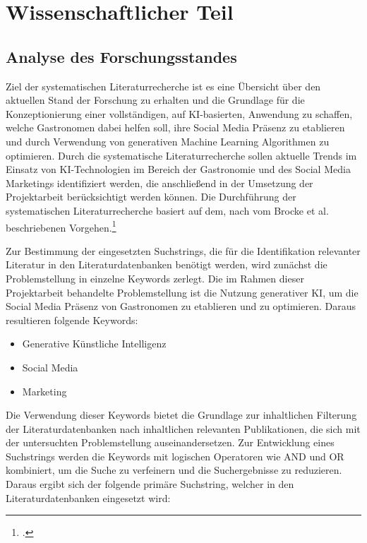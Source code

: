 \newpage
\section{Wissenschaftlicher Teil}

\subsection{Analyse des Forschungsstandes}
Ziel der systematischen Literaturrecherche ist es eine Übersicht über den aktuellen Stand der Forschung zu erhalten und die Grundlage für die Konzeptionierung einer vollständigen, auf \ac{KI}-basierten, Anwendung zu schaffen, welche Gastronomen dabei helfen soll, ihre Social Media Präsenz zu etablieren und durch Verwendung von generativen Machine Learning Algorithmen zu optimieren.
Durch die systematische Literaturrecherche sollen aktuelle Trends im Einsatz von \ac{KI}-Technologien im Bereich der Gastronomie und des Social Media Marketings identifiziert werden, die anschließend in der Umsetzung der Projektarbeit berücksichtigt werden können.
Die Durchführung der systematischen Literaturrecherche basiert auf dem, nach vom Brocke et al. beschriebenen Vorgehen.\footcite{brocke2015standing}

Zur Bestimmung der eingesetzten Suchstrings, die für die Identifikation relevanter Literatur in den Literaturdatenbanken benötigt werden, wird zunächst die Problemstellung in einzelne Keywords zerlegt.
Die im Rahmen dieser Projektarbeit behandelte Problemstellung ist die Nutzung generativer KI, um die Social Media Präsenz von Gastronomen zu etablieren und zu optimieren.
Daraus resultieren folgende Keywords:

\begin{itemize}
    \item Generative Künstliche Intelligenz
    \item Social Media
    \item Marketing
\end{itemize}

Die Verwendung dieser Keywords bietet die Grundlage zur inhaltlichen Filterung der Literaturdatenbanken nach inhaltlichen relevanten Publikationen, die sich mit der untersuchten Problemstellung auseinandersetzen.
Zur Entwicklung eines Suchstrings werden die Keywords mit logischen Operatoren wie AND und OR kombiniert, um die Suche zu verfeinern und die Suchergebnisse zu reduzieren.
Daraus ergibt sich der folgende primäre Suchstring, welcher in den Literaturdatenbanken eingesetzt wird:

